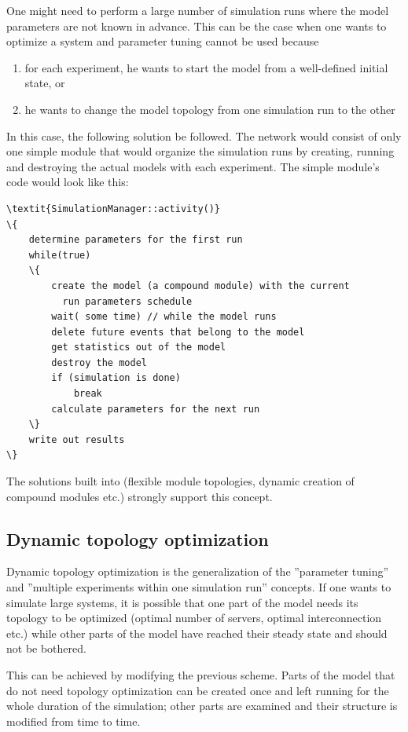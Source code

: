 One might need to perform a large number of simulation runs where
the model parameters are not known in advance. This can be the
case when one wants to optimize a system and parameter tuning
cannot be used because
\begin{enumerate}
\item{for each experiment, he wants to start the model from a
    well-defined initial state, or}
\item{he wants to change the model topology from one simulation run to
    the other}
\end{enumerate}

In this case, the following solution be followed. The network would
consist of only one simple module that would
organize the simulation runs by creating, running and destroying the
actual models with each experiment. The simple
module's code would look like this:


\begin{Verbatim}[commandchars=\\\{\}]
\textit{SimulationManager::activity()}
\{
    determine parameters for the first run
    while(true)
    \{
        create the model (a compound module) with the current
          run parameters schedule
        wait( some time) // while the model runs
        delete future events that belong to the model
        get statistics out of the model
        destroy the model
        if (simulation is done)
            break
        calculate parameters for the next run
    \}
    write out results
\}
\end{Verbatim}


The solutions built into {\opp} (flexible module topologies, dynamic
creation of compound modules etc.) strongly
support this concept.





\subsection{Dynamic topology optimization}

Dynamic topology optimization is
the generalization of the ''parameter tuning'' and ''multiple
experiments within one simulation run'' concepts. If one wants to
simulate large systems, it is possible that one part of the model
needs its topology to be optimized (optimal number of servers, optimal
interconnection etc.) while other parts of the model have reached
their steady state and should not be bothered.


This can be achieved by modifying the previous scheme. Parts
of the model that do not need topology optimization can be created
once and left running for the whole duration of the simulation;
other parts are examined and their structure is modified from
time to time.



